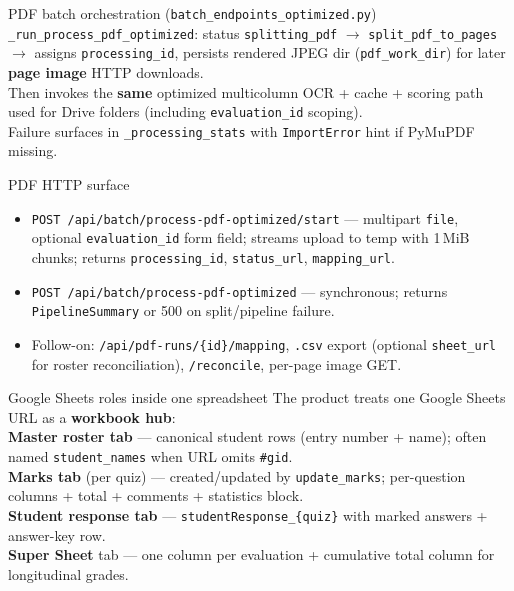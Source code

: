 \documentclass[aspectratio=169]{beamer}
\begin{document}
\begin{frame}{PDF batch orchestration (\texttt{batch\_endpoints\_optimized.py})}
  \small
  \texttt{\_run\_process\_pdf\_optimized}: status \texttt{splitting\_pdf} $\rightarrow$ \texttt{split\_pdf\_to\_pages} $\rightarrow$ assigns \texttt{processing\_id}, persists rendered JPEG dir (\texttt{pdf\_work\_dir}) for later \textbf{page image} HTTP downloads.\\
  Then invokes the \textbf{same} optimized multicolumn OCR + cache + scoring path used for Drive folders (including \texttt{evaluation\_id} scoping).\\
  Failure surfaces in \texttt{\_processing\_stats} with \texttt{ImportError} hint if PyMuPDF missing.
\end{frame}

\begin{frame}{PDF HTTP surface}
  \tiny
  \begin{itemize}\setlength\itemsep{0.1em}
    \item \texttt{POST /api/batch/process-pdf-optimized/start} --- multipart \texttt{file}, optional \texttt{evaluation\_id} form field; streams upload to temp with 1\,MiB chunks; returns \texttt{processing\_id}, \texttt{status\_url}, \texttt{mapping\_url}.
    \item \texttt{POST /api/batch/process-pdf-optimized} --- synchronous; returns \texttt{PipelineSummary} or 500 on split/pipeline failure.
    \item Follow-on: \texttt{/api/pdf-runs/\{id\}/mapping}, \texttt{.csv} export (optional \texttt{sheet\_url} for roster reconciliation), \texttt{/reconcile}, per-page image GET.
  \end{itemize}
\end{frame}

\begin{frame}{Google Sheets roles inside one spreadsheet}
  \small
  The product treats one Google Sheets URL as a \textbf{workbook hub}:\\[0.35em]
  \textbf{Master roster tab} --- canonical student rows (entry number + name); often named \texttt{student\_names} when URL omits \texttt{\#gid}.\\
  \textbf{Marks tab} (per quiz) --- created/updated by \texttt{update\_marks}; per-question columns + total + comments + statistics block.\\
  \textbf{Student response tab} --- \texttt{studentResponse\_\{quiz\}} with marked answers + answer-key row.\\
  \textbf{Super Sheet} tab --- one column per evaluation + cumulative total column for longitudinal grades.
\end{frame}
\end{document}
